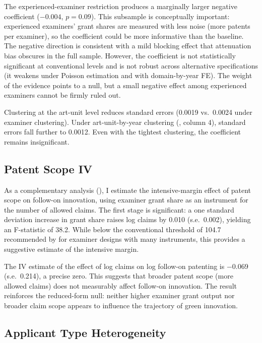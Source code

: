 \documentclass[12pt]{article}
\begin{document}
The experienced-examiner restriction produces a marginally larger negative coefficient ($-0.004$, $p = 0.09$). This subsample is conceptually important: experienced examiners' grant shares are measured with less noise (more patents per examiner), so the coefficient could be more informative than the baseline. The negative direction is consistent with a mild blocking effect that attenuation bias obscures in the full sample. However, the coefficient is not statistically significant at conventional levels and is not robust across alternative specifications (it weakens under Poisson estimation and with domain-by-year FE). The weight of the evidence points to a null, but a small negative effect among experienced examiners cannot be firmly ruled out.

Clustering at the art-unit level reduces standard errors (0.0019 vs.\ 0.0024 under examiner clustering). Under art-unit-by-year clustering (, column 4), standard errors fall further to 0.0012. Even with the tightest clustering, the coefficient remains insignificant.

\subsection{Patent Scope IV}

As a complementary analysis (), I estimate the intensive-margin effect of patent scope on follow-on innovation, using examiner grant share as an instrument for the number of allowed claims. The first stage is significant: a one standard deviation increase in grant share raises log claims by 0.010 (s.e.\ 0.002), yielding an F-statistic of 38.2. While below the conventional threshold of 104.7 recommended by \citet{chyn2024} for examiner designs with many instruments, this provides a suggestive estimate of the intensive margin.

The IV estimate of the effect of log claims on log follow-on patenting is $-0.069$ (s.e.\ 0.214), a precise zero. This suggests that broader patent scope (more allowed claims) does not measurably affect follow-on innovation. The result reinforces the reduced-form null: neither higher examiner grant output nor broader claim scope appears to influence the trajectory of green innovation.

\subsection{Applicant Type Heterogeneity}
\end{document}
